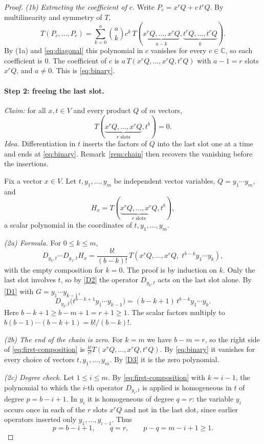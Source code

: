 \documentclass[11pt]{article}
\theoremstyle{remark}
\newcommand{\C}{\mathbb C}
\newcommand{\D}[2]{D_{#1,#2}}
\begin{document}
\begin{proof}
\emph{(1b) Extracting the coefficient of $c$.}
Write $P_c=x^rQ+c\,t^rQ$. By multilinearity and symmetry of $T$,
\[
 T(P_c,\ldots,P_c)=\sum_{k=0}^{a}\binom ak c^k\,
 T(\underbrace{x^rQ,\ldots,x^rQ}_{a-k},\underbrace{t^rQ,\ldots,t^rQ}_{k}).
\]
By (1a) and \eqref{eq:diagonal} this polynomial in $c$ vanishes for every
$c\in\C$, so each coefficient is $0$. The coefficient of $c$ is
$a\,T(x^rQ,\ldots,x^rQ,t^rQ)$ with $a-1=r$ slots $x^rQ$, and $a\ne0$.
This is \eqref{eq:binary}.

\paragraph{Step 2: freeing the last slot.}
\emph{Claim:} for all $x,t\in V$ and every product $Q$ of $m$ vectors,
\begin{equation}\label{eq:free}
 T(\underbrace{x^rQ,\ldots,x^rQ}_{r\text{ slots}},t^b)=0.
\end{equation}
\emph{Idea.} Differentiation in $t$ inserts the factors of $Q$ into the
last slot one at a time and ends at \eqref{eq:binary}.
Remark~\ref{rem:chain} then recovers the vanishing before the insertions.

Fix a vector $x\in V$. Let $t,y_1,\ldots,y_m$ be independent vector
variables, $Q=y_1\cdots y_m$, and
\[
 H_x=T(\underbrace{x^rQ,\ldots,x^rQ}_{r\text{ slots}},t^b),
\]
a scalar polynomial in the coordinates of $t,y_1,\ldots,y_m$.

\emph{(2a) Formula.} For $0\le k\le m$,
\begin{equation}\label{eq:first-composition}
 \D{y_k}{t}\cdots\D{y_1}{t}H_x
 =\frac{b!}{(b-k)!}\,
 T(x^rQ,\ldots,x^rQ,\;t^{b-k}y_1\cdots y_k),
\end{equation}
with the empty composition for $k=0$. The proof is by induction on $k$.
Only the last slot involves $t$, so by \ref{D2} the operator $\D{y_k}{t}$
acts on the last slot alone. By \ref{D1} with $G=y_1\cdots y_{k-1}$,
\[
 \D{y_k}{t}\bigl(t^{b-k+1}y_1\cdots y_{k-1}\bigr)
 =(b-k+1)\,t^{b-k}y_1\cdots y_k .
\]
Here $b-k+1\ge b-m+1=r+1\ge1$. The scalar factors multiply to
$b(b-1)\cdots(b-k+1)=b!/(b-k)!$.

\emph{(2b) The end of the chain is zero.}
For $k=m$ we have $b-m=r$, so the right side of
\eqref{eq:first-composition} is
$\frac{b!}{r!}T(x^rQ,\ldots,x^rQ,t^rQ)$. By \eqref{eq:binary} it vanishes
for every choice of vectors $t,y_1,\ldots,y_m$. By \ref{D3} it is the zero
polynomial.

\emph{(2c) Degree check.}
Let $1\le i\le m$. By \eqref{eq:first-composition} with $k=i-1$, the
polynomial to which the $i$-th operator $\D{y_i}{t}$ is applied is
homogeneous in $t$ of degree $p=b-i+1$. In $y_i$ it is homogeneous of
degree $q=r$: the variable $y_i$ occurs once in each of the $r$ slots
$x^rQ$ and not in the last slot, since earlier operators inserted only
$y_1,\ldots,y_{i-1}$. Thus
\[
 p=b-i+1,\qquad q=r,\qquad p-q=m-i+1\ge1 .
\]


\end{proof}
\end{document}
